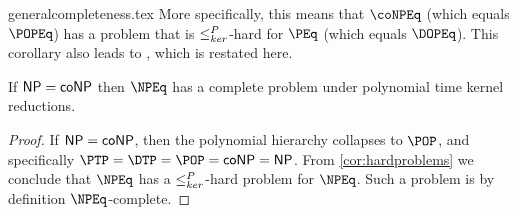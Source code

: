 \begin{filecontents}{generalcompleteness.tex}
More specifically, this means that $\coNPEq$ (which equals $\POPEq$) has a problem that is $\kr$-hard for $\PEq$ (which equals $\DOPEq$).
This corollary also leads to \cite[Theorem~8.7, part~1]{bcffm}, which is restated here.

\begin{corollary}
  If $\NP = \coNP$ then $\NPEq$ has a complete problem under polynomial time kernel reductions.
\end{corollary}
\begin{proof}
  If $\NP = \coNP$, then the polynomial hierarchy collapses to $\POP$, and specifically $\PTP = \DTP = \POP = \coNP = \NP$.
  From \ref{cor:hardproblems} we conclude that $\NPEq$ has a $\kr$-hard problem for $\NPEq$.
  Such a problem is by definition $\NPEq$-complete.
\end{proof}


\end{filecontents}
